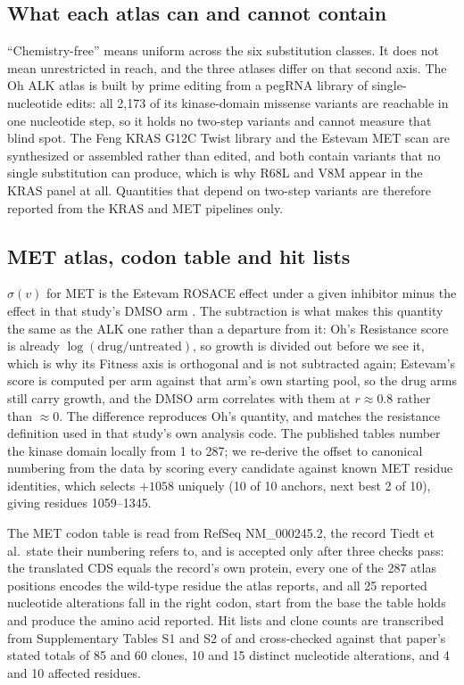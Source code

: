 \documentclass[11pt,a4paper]{article}
\begin{document}
\subsection{What each atlas can and cannot contain}
\label{sec:atlas-scope}
``Chemistry-free'' means uniform across the six substitution classes. It
does not mean unrestricted in reach, and the three atlases differ on that
second axis. The Oh ALK atlas is built by prime editing from a pegRNA
library of single-nucleotide edits: all 2,173 of its kinase-domain
missense variants are reachable in one nucleotide step, so it holds no
two-step variants and cannot measure that blind spot. The Feng KRAS G12C
Twist library and the Estevam MET scan are synthesized or assembled
rather than edited, and both contain variants that no single substitution
can produce, which is why R68L and V8M appear in the KRAS panel at all.
Quantities that depend on two-step variants are therefore reported from
the KRAS and MET pipelines only.

\subsection{MET atlas, codon table and hit lists}
\label{sec:met-methods}
$\sigma(v)$ for MET is the Estevam ROSACE effect under a given inhibitor
minus the effect in that study's DMSO arm \citep{estevam2024}. The
subtraction is what makes this quantity the same as the ALK one rather
than a departure from it: Oh's Resistance score is already
$\log(\mathrm{drug}/\mathrm{untreated})$, so growth is divided out before
we see it, which is why its Fitness axis is orthogonal and is not
subtracted again; Estevam's score is computed per arm against that arm's
own starting pool, so the drug arms still carry growth, and the DMSO arm
correlates with them at $r \approx 0.8$ rather than $\approx 0$. The
difference reproduces Oh's quantity, and matches the resistance
definition used in that study's own analysis code. The published tables
number the kinase domain locally from 1 to 287; we re-derive the offset
to canonical numbering from the data by scoring every candidate against
known MET residue identities, which selects $+1058$ uniquely (10 of 10
anchors, next best 2 of 10), giving residues 1059--1345.

The MET codon table is read from RefSeq NM\_000245.2, the record Tiedt
et al.\ state their numbering refers to, and is accepted only after three
checks pass: the translated CDS equals the record's own protein, every
one of the 287 atlas positions encodes the wild-type residue the atlas
reports, and all 25 reported nucleotide alterations fall in the right
codon, start from the base the table holds and produce the amino acid
reported. Hit lists and clone counts are transcribed from Supplementary
Tables S1 and S2 of \citep{tiedt2011} and cross-checked against that
paper's stated totals of 85 and 60 clones, 10 and 15 distinct
nucleotide alterations, and 4 and 10 affected residues.
\end{document}
